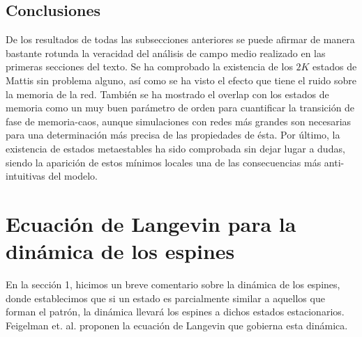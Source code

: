 \documentclass[titlepage,12pt]{article}
\numberwithin{equation}{section}
\begin{document}
	
	\subsection{Conclusiones}
	De los resultados de todas las subsecciones anteriores se puede afirmar de manera bastante rotunda la veracidad del análisis de campo medio realizado en las primeras secciones del texto. Se ha comprobado la existencia de los $2K$ estados de Mattis sin problema alguno, así como se ha visto el efecto que tiene el ruido sobre la memoria de la red. También se ha mostrado el overlap con los estados de memoria como un muy buen parámetro de orden para cuantificar la transición de fase de memoria-caos, aunque simulaciones con redes más grandes son necesarias para una determinación más precisa de las propiedades de ésta. Por último, la existencia de estados metaestables ha sido comprobada sin dejar lugar a dudas, siendo la aparición de estos mínimos locales una de las consecuencias más anti-intuitivas del modelo.
	
	\section{Ecuación de Langevin para la dinámica de los espines}
	En la sección 1, hicimos un breve comentario sobre la dinámica de los espines, donde establecimos que si un estado es parcialmente similar a aquellos que forman el patrón, la dinámica llevará los espines a dichos estados estacionarios. Feigelman et. al. \cite{feigelman86} proponen la ecuación de Langevin que gobierna esta dinámica. 
	
\end{document}
